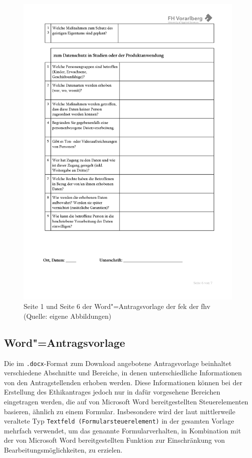 \documentclass[a4paper,12pt,twoside]{scrreprt}
\begin{document}
\begin{figure}[ht]
\begin{minipage}[b]{.49\linewidth}
        \includegraphics[width=\linewidth]{thesis/images/Luidold_Word-Vorlage-FHV-2.png}
    \end{minipage}
    \caption[{Seite 1 und Seite 6 der Word"=Antragsvorlage der \acl{fek} der \acl{fhv}}]{Seite 1 und Seite 6 der Word"=Antragsvorlage der \acs{fek} der \acs{fhv} (Quelle: eigene Abbildungen)}
    \label{fig:dokumentenvorlage-fek}
\end{figure}

\subsection{Word"=Antragsvorlage}
\label{sub-sec:technischer-aufbau-word-antragsvorlage}

Die im \texttt{.docx}-Format zum Download angebotene Antragsvorlage beinhaltet verschiedene Abschnitte und Bereiche, in denen unterschiedliche Informationen von den Antragstellenden erhoben werden. Diese Informationen können bei der Erstellung des Ethikantrages jedoch nur in dafür vorgesehene Bereichen eingetragen werden, die auf von Microsoft Word bereitgestellten Steuerelementen basieren, ähnlich zu einem Formular. Insbesondere wird der laut \cite{ay_textfelder_2023} mittlerweile veraltete Typ \texttt{Textfeld (Formularsteuerelement)} in der gesamten Vorlage mehrfach verwendet, um das genannte Formularverhalten, in Kombination mit der von Microsoft Word bereitgestellten Funktion zur Einschränkung von Bearbeitungsmöglichkeiten, zu erzielen.
\end{document}
